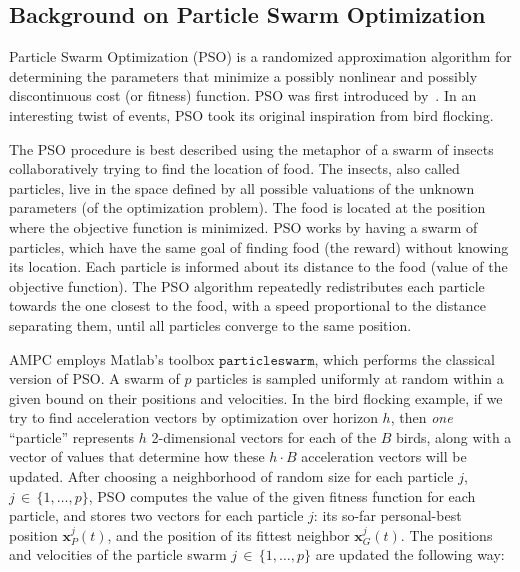 \subsection{Background on Particle Swarm Optimization}
\label{sec:swarmOptimization}

Particle Swarm Optimization (PSO) is a randomized approximation algorithm for determining the parameters that minimize a possibly nonlinear and possibly discontinuous cost (or fitness) function. PSO was first introduced by~\cite{Kennedy95particleswarm}. In an interesting twist of events, PSO took its original inspiration from bird flocking.


The PSO procedure is best described using the metaphor of a swarm of insects collaboratively trying to find the location of food. The insects, also called particles, live in the space defined by all possible valuations of the unknown parameters (of the optimization problem).  The food is located at the position where the objective function is minimized. PSO works by having a swarm of particles, which have the same goal of finding food (the reward) without knowing its location. Each particle is informed about its distance to the food (value of the objective function). The PSO algorithm repeatedly redistributes each particle towards the one closest to the food, with a speed proportional to the distance separating them, until all particles converge to the same position. 


AMPC employs Matlab's toolbox $\texttt{particleswarm}$, which performs the classical version of PSO. A swarm of $p$ particles is sampled uniformly at random within a given bound on their positions and velocities. In the bird flocking example, if we try to find acceleration vectors by optimization over horizon $h$, then {\em{one}} ``particle'' represents $h$ 2-dimensional vectors for each of the $B$ birds, along with a vector of values that determine how these $h\cdot B$ acceleration vectors will be updated. 
%
After choosing a neighborhood of random size for each particle $j$, $j\,{\in}\,\{1,\ldots,p\}$, PSO computes the value of the given fitness function for each particle, and stores two vectors for each particle $j$: its so-far personal-best position $\mathbf{x}_{P}^j(t)$, and the position of its fittest neighbor $\mathbf{x}_{G}^j(t)$. The positions and velocities of the particle swarm $j\,{\in}\,\{1,\ldots,p\}$ are updated the following way:

